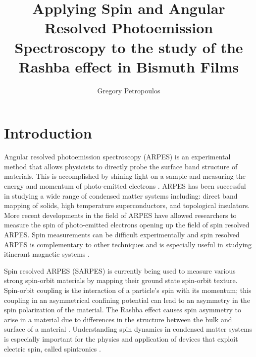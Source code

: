 \documentclass[12pt]{article}
\begin{document}
\title{Applying Spin and Angular Resolved Photoemission Spectroscopy to the study of the Rashba effect in Bismuth Films}
\author{Gregory Petropoulos}
\maketitle
{}

\section{Introduction}
Angular resolved photoemission spectroscopy (ARPES) is an experimental method that allows physicists to directly probe the surface band structure of materials.
This is accomplished by shining light on a sample and measuring the energy and momentum of photo-emitted electrons \cite{Damascelli}.
ARPES has been successful in studying a wide range of condensed matter systems including:  direct band mapping of solids,  high temperature superconductors, and topological insulators.
More recent developments in the field of ARPES have allowed researchers to measure the spin of photo-emitted electrons \cite{Dil, Osterwalder} opening up the field of spin resolved ARPES.
Spin measurements can be difficult experimentally and spin resolved ARPES is complementary to other techniques and is especially useful in studying itinerant magnetic systems \cite{Osterwalder}.

Spin resolved ARPES (SARPES) is currently being used to measure various strong spin-orbit materials by mapping their ground state spin-orbit texture.
Spin-orbit coupling is the interaction of a particle's spin with its momentum; this coupling in an asymmetrical confining potential can lead to an asymmetry in the spin polarization of the material.
The Rashba effect causes spin asymmetry to arise in a material due to differences in the structure between the bulk and surface of a material \cite{Dil}.
Understanding spin dynamics in condensed matter systems is especially important for the physics and application of devices that exploit electric spin, called spintronics \cite{wolf}.
\end{document}
